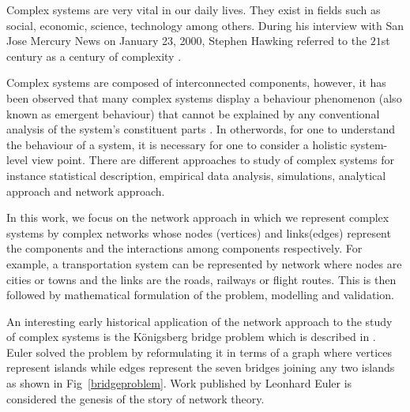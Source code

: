 \documentclass[10pt,a4paper]{article}
\theoremstyle{plain}
\theoremstyle{definition}
\begin{document}
Complex systems are very vital in our daily lives. They exist in fields such as social, economic, science, technology among others.  During his interview with San Jose Mercury News on January 23, 2000, Stephen Hawking referred to the $21$st century as a century of complexity \citep{Hawkinginterview}. 

Complex systems are composed of interconnected components, however, it has been observed that many complex systems display a behaviour phenomenon (also known as emergent behaviour) that cannot be explained by any conventional analysis of the system's constituent parts \citep{EncyBrit}. In otherwords, for one to understand the behaviour of a system, it is necessary for one to consider a holistic system-level view point. There are different approaches to study of complex systems for instance statistical description, empirical data analysis, simulations, analytical approach and network approach. 

In this work, we focus on the network approach in which we represent complex systems by complex networks whose nodes (vertices) and links(edges) represent the components and the interactions among components respectively.  For example, a transportation system can be represented by network where nodes are cities or towns and the links are the roads, railways or flight routes. This is then followed by mathematical formulation of the problem, modelling and validation.  

An interesting early historical application of the network approach to the study of complex systems is the K\"{o}nigsberg bridge problem which is described in \citep{euler1976solution,euler1953leonhard}. Euler solved the problem by reformulating it in terms of a graph where vertices represent islands while edges represent the seven bridges joining any two islands as shown in Fig~\ref{bridgeproblem}. Work published by Leonhard Euler \citep{euler1976solution} is considered the genesis of the story of network theory.
\end{document}
